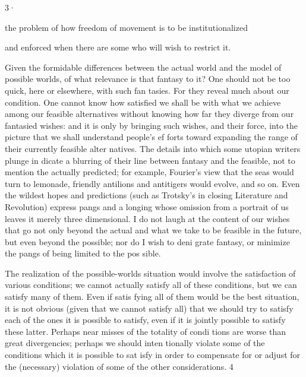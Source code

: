 \documentclass[11pt,openany]{book}
\begin{document}
3· 

the problem of how freedom of movement is to be institutionalized 

and enforced when there are some who will wish to restrict it. 

Given the formidable differences between the actual world and the model of possible worlds, of what relevance is that fantasy to it? One should not be too quick, here or elsewhere, with such fan tasies. For they reveal much about our condition. One cannot know how satisfied we shall be with what we achieve among our feasible alternatives without knowing how far they diverge from our fantasied wishes: and it is only by bringing such wishes, and their force, into the picture that we shall understand people's ef forts toward expanding the range of their currently feasible alter natives. The details into which some utopian writers plunge in dicate a blurring of their line between fantasy and the feasible, not to mention the actually predicted; for example, Fourier's view that the seas would turn to lemonade, friendly antilions and antitigers would evolve, and so on. Even the wildest hopes and predictions (such as Trotsky's in closing Literature and Revolution) express pangs and a longing whose omission from a portrait of us leaves it merely three dimensional. I do not laugh at the content of our wishes that go not only beyond the actual and what we take to be feasible in the future, but even beyond the possible; nor do I wish to deni grate fantasy, or minimize the pangs of being limited to the pos sible. 

The realization of the possible-worlds situation would involve the satisfaction of various conditions; we cannot actually satisfy all of these conditions, but we can satisfy many of them. Even if satis fying all of them would be the best situation, it is not obvious (given that we cannot satisfy all) that we should try to satisfy each of the ones it is possible to satisfy, even if it is jointly possible to satisfy these latter. Perhaps near misses of the totality of condi tions are worse than great divergencies; perhaps we should inten tionally violate some of the conditions which it is possible to sat isfy in order to compensate for or adjust for the (necessary) violation of some of the other considerations. 4 
\end{document}
